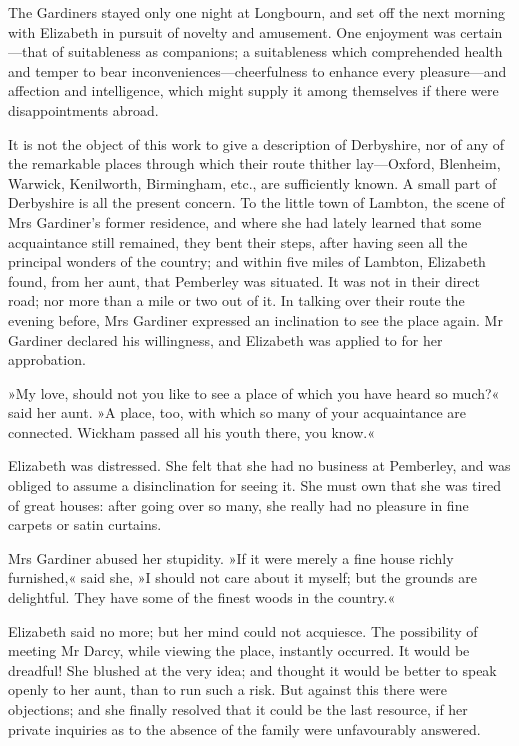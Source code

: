 The Gardiners stayed only one night at Longbourn, and set off the next morning with Elizabeth in pursuit of novelty and amusement. One enjoyment was certain—that of suitableness as companions; a suitableness which comprehended health and temper to bear inconveniences—cheerfulness to enhance every pleasure—and affection and intelligence, which might supply it among themselves if there were disappointments abroad.

It is not the object of this work to give a description of Derbyshire, nor of any of the remarkable places through which their route thither lay—Oxford, Blenheim, Warwick, Kenilworth, Birmingham, etc., are sufficiently known. A small part of Derbyshire is all the present concern. To the little town of Lambton, the scene of Mrs Gardiner's former residence, and where she had lately learned that some acquaintance still remained, they bent their steps, after having seen all the principal wonders of the country; and within five miles of Lambton, Elizabeth found, from her aunt, that Pemberley was situated. It was not in their direct road; nor more than a mile or two out of it. In talking over their route the evening before, Mrs Gardiner expressed an inclination to see the place again. Mr Gardiner declared his willingness, and Elizabeth was applied to for her approbation.

»My love, should not you like to see a place of which you have heard so much?« said her aunt. »A place, too, with which so many of your acquaintance are connected. Wickham passed all his youth there, you know.«

Elizabeth was distressed. She felt that she had no business at Pemberley, and was obliged to assume a disinclination for seeing it. She must own that she was tired of great houses: after going over so many, she really had no pleasure in fine carpets or satin curtains.

Mrs Gardiner abused her stupidity. »If it were merely a fine house richly furnished,« said she, »I should not care about it myself; but the grounds are delightful. They have some of the finest woods in the country.«

Elizabeth said no more; but her mind could not acquiesce. The possibility of meeting Mr Darcy, while viewing the place, instantly occurred. It would be dreadful! She blushed at the very idea; and thought it would be better to speak openly to her aunt, than to run such a risk. But against this there were objections; and she finally resolved that it could be the last resource, if her private inquiries as to the absence of the family were unfavourably answered.

